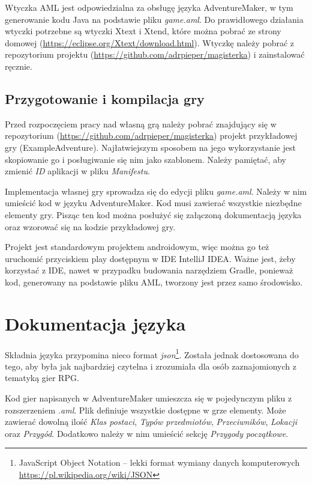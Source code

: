\documentclass[openright]{xmgr}
\begin{document}
Wtyczka AML jest odpowiedzialna za obsługę języka AdventureMaker, w tym generowanie kodu Java na podstawie pliku \textit{game.aml}. Do prawidłowego działania wtyczki potrzebne są wtyczki Xtext i Xtend, które można pobrać ze strony domowej (\url{https://eclipse.org/Xtext/download.html}).
Wtyczkę należy pobrać z repozytorium projektu (\url{https://github.com/adrpieper/magisterka}) i zainstalować ręcznie.

\section{Przygotowanie i kompilacja gry}
Przed rozpoczęciem pracy nad własną grą należy pobrać znajdujący się w repozytorium (\url{https://github.com/adrpieper/magisterka}) projekt przykładowej gry (ExampleAdventure). Najłatwiejszym sposobem na jego wykorzystanie jest skopiowanie go i posługiwanie się nim jako szablonem. Należy pamiętać, aby zmienić \textit{ID} aplikacji w pliku \textit{Manifestu}.

Implementacja własnej gry sprowadza się do edycji pliku \textit{game.aml}. Należy w nim umieścić kod w języku AdventureMaker. Kod musi  zawierać wszystkie niezbędne elementy gry. Pisząc ten kod można posłużyć się załączoną dokumentacją języka oraz wzorować się na kodzie przykładowej gry.

Projekt jest standardowym projektem androidowym, więc można go też uruchomić przyciskiem play dostępnym w IDE IntelliJ IDEA. Ważne jest, żeby korzystać z IDE, nawet w przypadku budowania narzędziem Gradle, ponieważ kod, generowany na podstawie pliku AML, tworzony jest przez samo środowisko.

\chapter{Dokumentacja języka} 

Składnia języka przypomina nieco format \textit{json}\footnote{JavaScript Object Notation -- lekki format wymiany danych komputerowych \url{https://pl.wikipedia.org/wiki/JSON}}. Została jednak dostosowana do tego, aby była jak najbardziej czytelna i zrozumiała dla osób zaznajomionych z tematyką gier RPG.

Kod gier napisanych w AdventureMaker umieszcza się w pojedynczym pliku z rozszerzeniem \textit{.aml}. Plik definiuje wszystkie dostępne w grze elementy. Może zawierać dowolną ilość \textit{Klas postaci}, \textit{Typów przedmiotów}, \textit{Przeciwników}, \textit{Lokacji} oraz \textit{Przygód}. Dodatkowo należy w nim umieścić sekcję \textit{Przygody początkowe}. 
\end{document}
